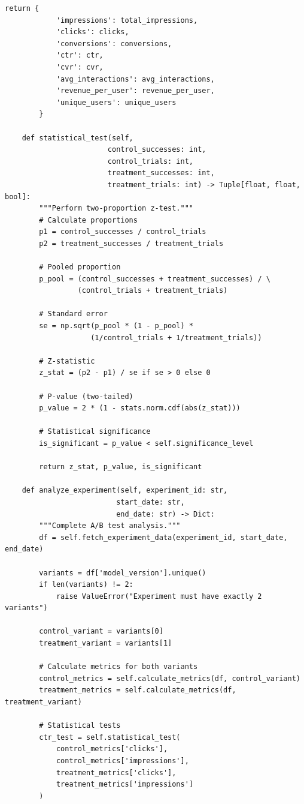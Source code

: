 \begin{lstlisting}[style=python, caption=A/B Test Analysis]
        return {
            'impressions': total_impressions,
            'clicks': clicks,
            'conversions': conversions,
            'ctr': ctr,
            'cvr': cvr,
            'avg_interactions': avg_interactions,
            'revenue_per_user': revenue_per_user,
            'unique_users': unique_users
        }

    def statistical_test(self,
                        control_successes: int,
                        control_trials: int,
                        treatment_successes: int,
                        treatment_trials: int) -> Tuple[float, float, bool]:
        """Perform two-proportion z-test."""
        # Calculate proportions
        p1 = control_successes / control_trials
        p2 = treatment_successes / treatment_trials

        # Pooled proportion
        p_pool = (control_successes + treatment_successes) / \
                 (control_trials + treatment_trials)

        # Standard error
        se = np.sqrt(p_pool * (1 - p_pool) *
                    (1/control_trials + 1/treatment_trials))

        # Z-statistic
        z_stat = (p2 - p1) / se if se > 0 else 0

        # P-value (two-tailed)
        p_value = 2 * (1 - stats.norm.cdf(abs(z_stat)))

        # Statistical significance
        is_significant = p_value < self.significance_level

        return z_stat, p_value, is_significant

    def analyze_experiment(self, experiment_id: str,
                          start_date: str,
                          end_date: str) -> Dict:
        """Complete A/B test analysis."""
        df = self.fetch_experiment_data(experiment_id, start_date, end_date)

        variants = df['model_version'].unique()
        if len(variants) != 2:
            raise ValueError("Experiment must have exactly 2 variants")

        control_variant = variants[0]
        treatment_variant = variants[1]

        # Calculate metrics for both variants
        control_metrics = self.calculate_metrics(df, control_variant)
        treatment_metrics = self.calculate_metrics(df, treatment_variant)

        # Statistical tests
        ctr_test = self.statistical_test(
            control_metrics['clicks'],
            control_metrics['impressions'],
            treatment_metrics['clicks'],
            treatment_metrics['impressions']
        )


\end{lstlisting}
